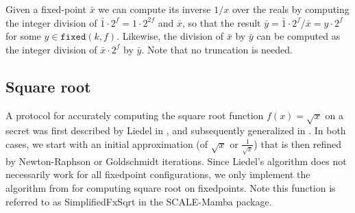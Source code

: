 Given a fixed-point $\bar{x}$ we can compute its inverse $1/x$ over the reals by
computing the integer division of $\bar{1} \cdot 2^f = 1 \cdot 2^{2f}$ and $\bar{x}$,
so that the result $\bar{y} = \bar{1} \cdot 2^f / \bar{x} = y \cdot 2^f$ for some
$y \in \mathtt{fixed}(k, f)$. Likewise, the division of $\bar{x}$ by $\bar{y}$ can
be computed as the integer division of $\bar{x} \cdot 2^f$ by $\bar{y}$. Note that
no truncation is needed.

\subsection{Square root}

A protocol for accurately computing the square root function $f(x) = \sqrt{x}$ on a
secret was first described by Liedel in \cite{Liedel2012SecureDC}, and subsequently
generalized in \cite{cryptoeprint:2019:354}. In both cases, we start with an initial
approximation (of $\sqrt{x}$ or $\frac{1}{\sqrt{x}}$) that is then refined by
Newton-Raphson or Goldschmidt iterations. Since Liedel's algorithm does not
necessarily work for all fixedpoint configurations, we only implement the algorithm
from \cite{cryptoeprint:2019:354} for computing square root on fixedpoints. Note this
function is referred to as SimplifiedFxSqrt in the SCALE-Mamba package.
